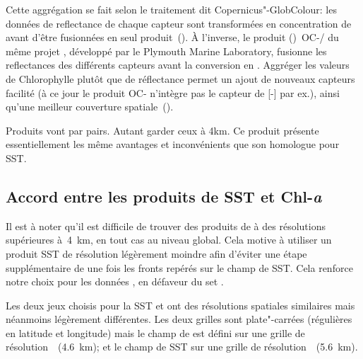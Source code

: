 \begin{note}[label={note:merge-chl-or-rrs}]
  Cette aggrégation se fait selon le traitement dit Copernicus"-GlobColour: les données de reflectance de chaque capteur sont transformées en concentration de  avant d'être fusionnées en seul produit~(\cite{garnesson_2019}).
  À l'inverse, le produit ()~OC-/ du même projet , développé par le Plymouth Marine Laboratory, fusionne les reflectances des différents capteurs avant la conversion en .
  Aggréger les valeurs de Chlorophylle plutôt que de réflectance permet  un ajout de nouveaux capteurs facilité (à ce jour le produit OC- n'intègre pas le capteur de [-] par ex.), ainsi qu'une meilleur couverture spatiale~(\cite{garnesson_2019}).
\end{note}

Produits vont par pairs.
Autant garder ceux à 4km.
Ce produit présente essentiellement les même avantages et inconvénients que son homologue pour SST.

\begin{figure}
  \centering
  \label{fig:comparaison-chl}
\end{figure}

\subsection{Accord entre les produits de SST et Chl-\textit{a}}

Il est à noter qu'il est difficile de trouver des produits de  à des résolutions supérieures à~\qty{4}{\km}, en tout cas au niveau global.
Cela motive à utiliser un produit SST de résolution légèrement moindre afin d'éviter une étape supplémentaire de  une fois les fronts repérés sur le champ de SST.
Cela renforce notre choix pour les données , en défaveur du set .

Les deux jeux choisis pour la SST et  ont des résolutions spatiales similaires mais néanmoins légèrement différentes.
Les deux grilles sont plate"-carrées (régulières en latitude et longitude) mais le champ de  est défini sur une grille  de résolution~~(\tapprox\qty{4.6}{\km}); et le champ de SST sur une grille  de résolution~~(\tapprox\qty{5.6}{\km}).

